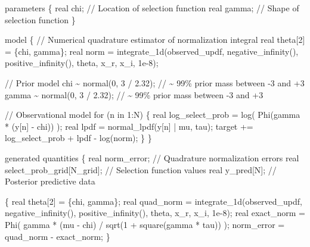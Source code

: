 \documentclass[
  letterpaper,
  DIV=11,
  numbers=noendperiod]{scrartcl}
\newenvironment{Shaded}{\begin{snugshade}}{\end{snugshade}}
\newcommand{\CommentTok}[1]{\textcolor[rgb]{0.37,0.37,0.37}{#1}}
\newcommand{\ControlFlowTok}[1]{\textcolor[rgb]{0.00,0.23,0.31}{#1}}
\newcommand{\DataTypeTok}[1]{\textcolor[rgb]{0.68,0.00,0.00}{#1}}
\newcommand{\DecValTok}[1]{\textcolor[rgb]{0.68,0.00,0.00}{#1}}
\newcommand{\FloatTok}[1]{\textcolor[rgb]{0.68,0.00,0.00}{#1}}
\newcommand{\KeywordTok}[1]{\textcolor[rgb]{0.00,0.23,0.31}{#1}}
\newcommand{\NormalTok}[1]{\textcolor[rgb]{0.00,0.23,0.31}{#1}}
\begin{document}
\begin{codelisting}
\begin{Shaded}
\begin{Highlighting}[]
\KeywordTok{parameters}\NormalTok{ \{}
  \DataTypeTok{real}\NormalTok{ chi;   }\CommentTok{// Location of selection function}
  \DataTypeTok{real}\NormalTok{ gamma; }\CommentTok{// Shape of selection function}
\NormalTok{\}}

\KeywordTok{model}\NormalTok{ \{}
  \CommentTok{// Numerical quadrature estimator of normalization integral}
  \DataTypeTok{real}\NormalTok{ theta[}\DecValTok{2}\NormalTok{] = \{chi, gamma\};}
  \DataTypeTok{real}\NormalTok{ norm = integrate\_1d(observed\_updf,}
\NormalTok{                           negative\_infinity(), positive\_infinity(),}
\NormalTok{                           theta, x\_r, x\_i, }\FloatTok{1e{-}8}\NormalTok{);}
  
  \CommentTok{// Prior model}
\NormalTok{  chi \textasciitilde{} normal(}\DecValTok{0}\NormalTok{, }\DecValTok{3}\NormalTok{ / }\FloatTok{2.32}\NormalTok{);   }\CommentTok{// \textasciitilde{} 99\% prior mass between {-}3 and +3}
\NormalTok{  gamma \textasciitilde{} normal(}\DecValTok{0}\NormalTok{, }\DecValTok{3}\NormalTok{ / }\FloatTok{2.32}\NormalTok{); }\CommentTok{// \textasciitilde{} 99\% prior mass between {-}3 and +3}
  
  \CommentTok{// Observational model}
  \ControlFlowTok{for}\NormalTok{ (n }\ControlFlowTok{in} \DecValTok{1}\NormalTok{:N) \{}
    \DataTypeTok{real}\NormalTok{ log\_select\_prob = log( Phi(gamma * (y[n] {-} chi)) );}
    \DataTypeTok{real}\NormalTok{ lpdf = normal\_lpdf(y[n] | mu, tau);}
    \KeywordTok{target +=}\NormalTok{ log\_select\_prob + lpdf {-} log(norm);}
\NormalTok{  \}}
\NormalTok{\}}

\KeywordTok{generated quantities}\NormalTok{ \{}
  \DataTypeTok{real}\NormalTok{ norm\_error;               }\CommentTok{// Quadrature normalization errors}
  \DataTypeTok{real}\NormalTok{ select\_prob\_grid[N\_grid]; }\CommentTok{// Selection function values}
  \DataTypeTok{real}\NormalTok{ y\_pred[N];                }\CommentTok{// Posterior predictive data}

\NormalTok{  \{}
    \DataTypeTok{real}\NormalTok{ theta[}\DecValTok{2}\NormalTok{] = \{chi, gamma\};}
    \DataTypeTok{real}\NormalTok{ quad\_norm = integrate\_1d(observed\_updf,}
\NormalTok{                                  negative\_infinity(), }
\NormalTok{                                  positive\_infinity(),}
\NormalTok{                                  theta, x\_r, x\_i, }\FloatTok{1e{-}8}\NormalTok{);}
    \DataTypeTok{real}\NormalTok{ exact\_norm = Phi(  gamma * (mu {-} chi) }
\NormalTok{                          / sqrt(}\DecValTok{1}\NormalTok{ + square(gamma * tau)) );}
\NormalTok{    norm\_error = quad\_norm {-} exact\_norm;}
\NormalTok{  \}}
  

\end{Highlighting}
\end{Shaded}
\end{codelisting}
\end{document}
